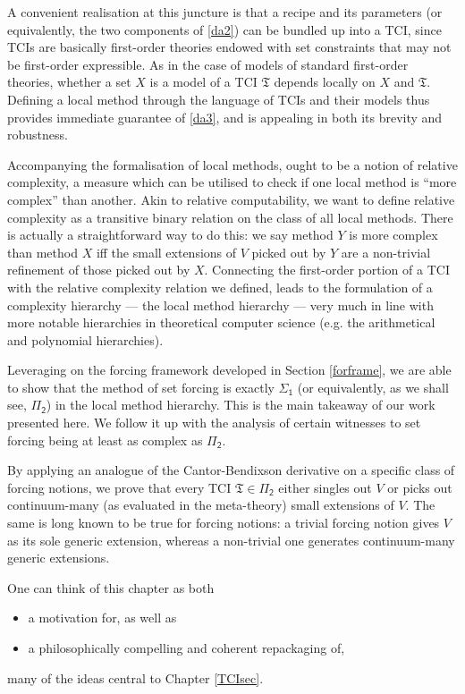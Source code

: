 \documentclass[12pt, twoside]{memoir}
\numberwithin{equation}{section}
\theoremstyle{definition}
\theoremstyle{remark}
\theoremstyle{definition}
\theoremstyle{definition}
\theoremstyle{definition}
\theoremstyle{remark}
\begin{document}
A convenient realisation at this juncture is that a recipe and its parameters (or equivalently, the two components of \ref{da2}) can be bundled up into a TCI, since TCIs are basically first-order theories endowed with set constraints that may not be first-order expressible. As in the case of models of standard first-order theories, whether a set $X$ is a model of a TCI $\mathfrak{T}$ depends locally on $X$ and $\mathfrak{T}$. Defining a local method through the language of TCIs and their models thus provides immediate guarantee of \ref{da3}, and is appealing in both its brevity and robustness.

Accompanying the formalisation of local methods, ought to be a notion of relative complexity, a measure which can be utilised to check if one local method is ``more complex'' than another. Akin to relative computability, we want to define relative complexity as a transitive binary relation on the class of all local methods. There is actually a straightforward way to do this: we say method $Y$ is more complex than method $X$ iff the small extensions of $V$ picked out by $Y$ are a non-trivial refinement of those picked out by $X$. Connecting the first-order portion of a TCI with the relative complexity relation we defined, leads to the formulation of a complexity hierarchy --- the local method hierarchy --- very much in line with more notable hierarchies in theoretical computer science (e.g. the arithmetical and polynomial hierarchies).

Leveraging on the forcing framework developed in Section \ref{forframe}, we are able to show that the method of set forcing is exactly $\mathsf{\Sigma_1}$ (or equivalently, as we shall see, $\mathsf{\Pi_2}$) in the local method hierarchy. This is the main takeaway of our work presented here. We follow it up with the analysis of certain witnesses to set forcing being at least as complex as $\mathsf{\Pi_2}$.

By applying an analogue of the Cantor-Bendixson derivative on a specific class of forcing notions, we prove that every TCI $\mathfrak{T} \in \mathsf{\Pi_2}$ either singles out $V$ or picks out continuum-many (as evaluated in the meta-theory) small extensions of $V$. The same is long known to be true for forcing notions: a trivial forcing notion gives $V$ as its sole generic extension, whereas a non-trivial one generates continuum-many generic extensions.

One can think of this chapter as both 
\begin{itemize}
    \item a motivation for, as well as 
    \item a philosophically compelling and coherent repackaging of, 
\end{itemize}
many of the ideas central to Chapter \ref{TCIsec}. 
\end{document}
